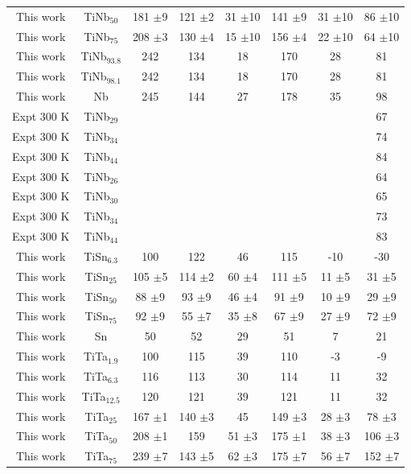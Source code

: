 \begin{longtable}[H]{ c c c c c c c c}
	This work & TiNb$_{50}$ & 181 $\pm$9 & 121 $\pm$2 & 31 $\pm$10 & 141 $\pm$9 & 31 $\pm$10 & 86 $\pm$10\\
	This work & TiNb$_{75}$ & 208 $\pm$3 & 130 $\pm$4 & 15 $\pm$10 & 156 $\pm$4 & 22 $\pm$10 & 64 $\pm$10\\
	This work & TiNb$_{93.8}$ & 242 & 134 & 18 & 170 & 28 & 81\\
	This work & TiNb$_{98.1}$ & 242 & 134 & 18 & 170 & 28 & 81\\
	This work & Nb & 245 & 144 & 27 & 178 & 35 & 98\\
	Expt 300 K \cite{Ozaki2004} & TiNb$_{29}$ & & & & & & 67\\
	Expt 300 K \cite{Ozaki2004} & TiNb$_{34}$ & & & & & & 74\\
	Expt 300 K \cite{Ozaki2004} & TiNb$_{44}$ & & & & & & 84\\
	Expt 300 K \cite{Boyer1994} & TiNb$_{26}$ & & & & & & 64\\
	Expt 300 K \cite{Boyer1994} & TiNb$_{30}$ & & & & & & 65\\
	Expt 300 K \cite{Boyer1994} & TiNb$_{34}$ & & & & & & 73\\
	Expt 300 K \cite{Boyer1994} & TiNb$_{44}$ & & & & & & 83\\
	This work & TiSn$_{6.3}$ & 100 & 122 & 46 & 115 & -10 & -30\\
	This work & TiSn$_{25}$ & 105 $\pm$5 & 114 $\pm$2 & 60 $\pm$4 & 111 $\pm$5 & 11 $\pm$5 & 31 $\pm$5\\
	This work & TiSn$_{50}$ & 88 $\pm$9 & 93 $\pm$9 & 46 $\pm$4 & 91 $\pm$9 & 10 $\pm$9 & 29 $\pm$9\\
	This work & TiSn$_{75}$ & 92 $\pm$9 & 55 $\pm$7 & 35 $\pm$8 & 67 $\pm$9 & 27 $\pm$9 & 72 $\pm$9\\
	This work & Sn & 50 & 52 & 29 & 51 & 7 & 21\\
	This work & TiTa$_{1.9}$ & 100 & 115 & 39 & 110 & -3 & -9\\
	This work & TiTa$_{6.3}$ & 116 & 113 & 30 & 114 & 11 & 32\\
	This work & TiTa$_{12.5}$ & 120 & 121 & 39 & 121 & 11 & 32\\
	This work & TiTa$_{25}$ & 167 $\pm$1 & 140 $\pm$3 & 45 & 149 $\pm$3 & 28 $\pm$3 & 78 $\pm$3\\
	This work & TiTa$_{50}$ & 208 $\pm$1 & 159 & 51 $\pm$3 & 175 $\pm$1 & 38 $\pm$3 & 106 $\pm$3\\
	This work & TiTa$_{75}$ & 239 $\pm$7 & 143 $\pm$5 & 62 $\pm$3 & 175 $\pm$7 & 56 $\pm$7 & 152 $\pm$7\\

\end{longtable}
